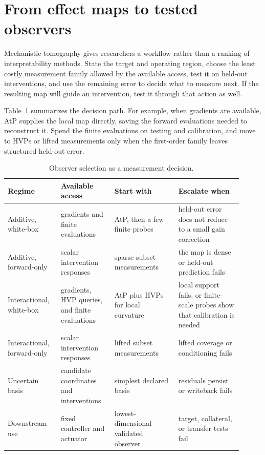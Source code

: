 \documentclass[sigconf,10pt,nonacm,balance=false]{acmart}
\begin{document}
\section{From effect maps to tested observers}\label{sec:discussion}

Mechanistic tomography gives researchers a workflow rather than a ranking of interpretability methods. State the target and operating region, choose the least costly measurement family allowed by the available access, test it on held-out interventions, and use the remaining error to decide what to measure next. If the resulting map will guide an intervention, test it through that action as well.

Table~\ref{tab:designs} summarizes the decision path. For example, when gradients are available, AtP supplies the local map directly, saving the forward evaluations needed to reconstruct it. Spend the finite evaluations on testing and calibration, and move to HVPs or lifted measurements only when the first-order family leaves structured held-out error.

\begin{table}[t]
\centering
\caption{Observer selection as a measurement decision.}
\label{tab:designs}
\scriptsize
\setlength{\tabcolsep}{2pt}
\begin{tabular}{p{0.20\linewidth}p{0.21\linewidth}p{0.25\linewidth}p{0.25\linewidth}}
\toprule
Regime & Available access & Start with & Escalate when \\
\midrule
Additive, white-box & gradients and finite evaluations & AtP, then a few finite probes & held-out error does not reduce to a small gain correction \\
Additive, forward-only & scalar intervention responses & sparse subset measurements & the map is dense or held-out prediction fails \\
Interactional, white-box & gradients, HVP queries, and finite evaluations & AtP plus HVPs for local curvature & local support fails, or finite-scale probes show that calibration is needed \\
Interactional, forward-only & scalar intervention responses & lifted subset measurements & lifted coverage or conditioning fails \\
Uncertain basis & candidate coordinates and interventions & simplest declared basis & residuals persist or writeback fails \\
Downstream use & fixed controller and actuator & lowest-dimensional validated observer & target, collateral, or transfer tests fail \\
\bottomrule
\end{tabular}
\end{table}
\end{document}
